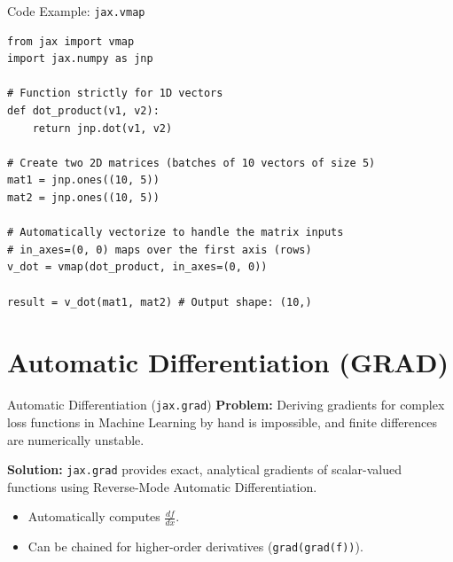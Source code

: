 \documentclass[aspectratio=169]{beamer}
\begin{document}
\begin{frame}[fragile]{Code Example: \texttt{jax.vmap}}
    \begin{lstlisting}
from jax import vmap
import jax.numpy as jnp

# Function strictly for 1D vectors
def dot_product(v1, v2):
    return jnp.dot(v1, v2)

# Create two 2D matrices (batches of 10 vectors of size 5)
mat1 = jnp.ones((10, 5))
mat2 = jnp.ones((10, 5))

# Automatically vectorize to handle the matrix inputs
# in_axes=(0, 0) maps over the first axis (rows)
v_dot = vmap(dot_product, in_axes=(0, 0))

result = v_dot(mat1, mat2) # Output shape: (10,)
    \end{lstlisting}
\end{frame}

\section{Automatic Differentiation (GRAD)}

\begin{frame}{Automatic Differentiation (\texttt{jax.grad})}
    \textbf{Problem:} Deriving gradients for complex loss functions in Machine Learning by hand is impossible, and finite differences are numerically unstable.

    \vspace{0.3cm}
    \textbf{Solution:} \texttt{jax.grad} provides exact, analytical gradients of scalar-valued functions using Reverse-Mode Automatic Differentiation.

    \vspace{0.3cm}
    \begin{itemize}
        \item Automatically computes $\frac{df}{dx}$.
        \item Can be chained for higher-order derivatives (\texttt{grad(grad(f))}).
    \end{itemize}
\end{frame}
\end{document}
